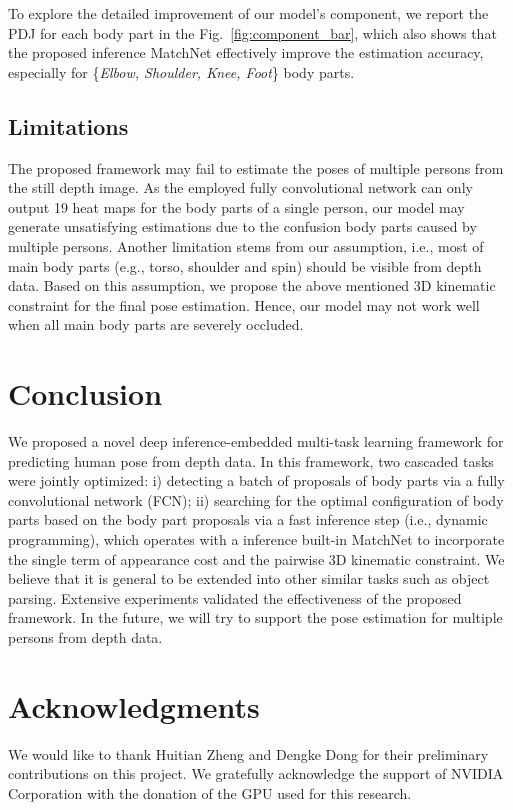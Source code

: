 \documentclass{sig-alternate-05-2015}
\begin{document}
To explore the detailed improvement of our model's component, we report the PDJ for each body part in the Fig.~\ref{fig:component_bar}, which also shows that the proposed inference MatchNet effectively improve the estimation accuracy, especially for \{\emph{Elbow, Shoulder, Knee, Foot}\} body parts. 


\subsection{Limitations}
The proposed framework may fail to estimate the poses of multiple persons from the still depth image. As the employed fully convolutional network can only output 19 heat maps for the body parts of a single person, our model may generate unsatisfying estimations due to the confusion body parts caused by multiple persons. Another limitation stems from our assumption, i.e., most of main body parts (e.g., torso, shoulder and spin) should be visible from depth data. Based on this assumption, we propose the above mentioned 3D kinematic constraint for the final pose estimation. Hence, our model may not work well when all main body parts are severely occluded. 


\section{Conclusion}
\label{sec:con}
We proposed a novel deep inference-embedded multi-task learning framework for predicting human pose from depth data. In this framework, two cascaded tasks were jointly optimized: i) detecting a batch of proposals of body parts via a fully convolutional network (FCN); ii) searching for the optimal configuration of body parts based on the body part proposals via a fast inference step (i.e., dynamic programming), which operates with a inference built-in MatchNet to incorporate the single term of appearance cost and the pairwise 3D kinematic constraint. We believe that it is general to be extended into other similar tasks such as object parsing. Extensive experiments validated the effectiveness of the proposed framework. In the future, we will try to support the pose estimation for multiple persons from depth data. 


\section{Acknowledgments}
We would like to thank Huitian Zheng and Dengke Dong for their preliminary contributions on this project. We gratefully acknowledge the support of NVIDIA Corporation with the donation of the GPU used for this research.


\end{document}
